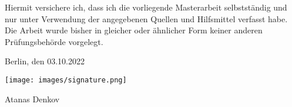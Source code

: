 
Hiermit versichere ich, dass ich die vorliegende Masterarbeit selbstständig und nur unter Verwendung der angegebenen Quellen und Hilfsmittel verfasst habe. Die Arbeit wurde bisher in gleicher oder ähnlicher Form keiner anderen Prüfungsbehörde vorgelegt.

\vskip 1cm

Berlin, den 03.10.2022

\vskip 0.5cm

\raggedright\texttt{[image: images/signature.png]}

Atanas Denkov
